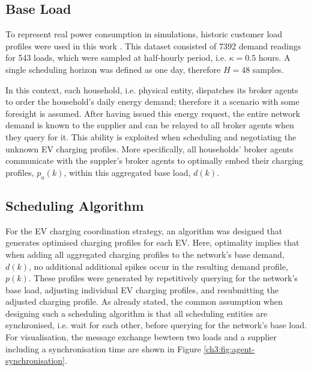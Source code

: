 \subsection{Base Load}

To represent real power consumption in simulations, historic customer load profiles were used in this work \cite{IrishData2002}.
This dataset consisted of 7392 demand readings for 543 loads, which were sampled at half-hourly period, i.e. $\kappa = 0.5$ hours.
A single scheduling horizon was defined as one day, therefore $H=48$ samples.

In this context, each household, i.e. physical entity, dispatches its broker agents to order the household's daily energy demand; therefore it a scenario with some foresight is assumed.
After having issued this energy request, the entire network demand is known to the supplier and can be relayed to all broker agents when they query for it.
This ability is exploited when scheduling and negotiating the unknown EV charging profiles.
More specifically, all households' broker agents communicate with the suppler's broker agents to optimally embed their charging profiles, $p_u(k)$, within this aggregated base load, $d(k)$.

\subsection{Scheduling Algorithm}

For the EV charging coordination strategy, an algorithm was designed that generates optimised charging profiles for each EV.
Here, optimality implies that when adding all aggregated charging profiles to the network's base demand, $d(k)$, no additional additional spikes occur in the resulting demand profile, $p(k)$.
These profiles were generated by repetitively querying for the network's base load, adjusting individual EV charging profiles, and resubmitting the adjusted charging profile.
As already stated, the common assumption when designing such a scheduling algorithm is that all scheduling entities are synchronised, i.e. wait for each other, before querying for the network's base load.
For visualisation, the message exchange bewteen two loads and a supplier including a synchronisation time are shown in Figure \ref{ch3:fig:agent-synchronisation}.



